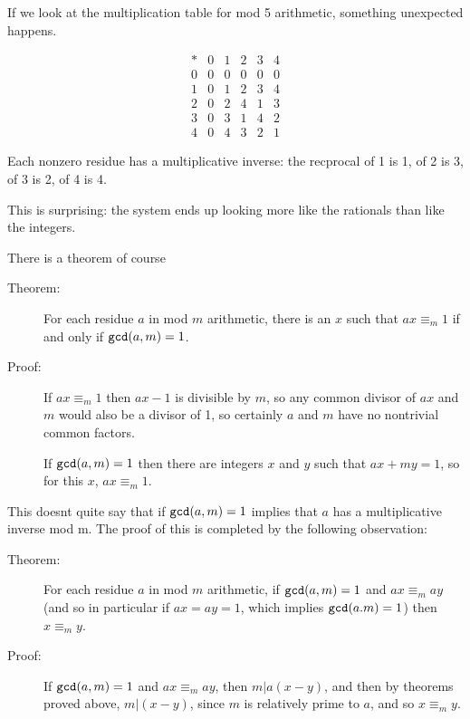 \documentclass[12pt]{article}
\begin{document}
\begin{description}
If we look at the multiplication table for mod 5 arithmetic, something unexpected happens.

$$\begin{array}{c|ccccc}

* & 0& 1 &2& 3 & 4\\ \hline

0 & 0& 0 &0& 0 &0 \\
1 & 0& 1 &2& 3 & 4\\
2& 0& 2 &4 & 1 & 3 \\
3& 0& 3 &1 & 4 & 2\\

4 & 0 & 4 & 3 & 2 & 1

\end{array}$$



\end{description}

Each nonzero residue has a multiplicative inverse:  the recprocal of 1 is 1, of 2 is 3, of 3 is 2, of 4 is 4.

This is surprising:  the system ends up looking more like the rationals than like the integers.

There is a theorem of course

\begin{description}

\item[Theorem:]  For each residue $a$ in mod $m$ arithmetic, there is an $x$ such that $ax \equiv_m 1$ if and only if
${\tt gcd}(a,m)=1$.

\item[Proof:]  If $ax \equiv_m 1$ then $ax-1$ is divisible by $m$, so any common divisor of $ax$ and $m$ would also be a divisor of 1,
so certainly $a$ and $m$ have no nontrivial common factors.

If ${\tt gcd}(a,m)=1$ then there are integers $x$ and $y$ such that $ax+my=1$, so for this $x$, $ax \equiv_m 1$.

\end{description}

This doesnt quite say that if ${\tt gcd}(a,m)=1$ implies that $a$ has a multiplicative inverse mod m.  The proof of this is completed
by the following observation:

\begin{description}

\item[Theorem:]  For each residue $a$ in mod $m$ arithmetic, if ${\tt gcd}(a,m)=1$ and $ax \equiv_m ay$ (and so in particular if $ax=ay=1$, which implies ${\tt gcd}(a.m)=1$) then $x \equiv_m y$.

\item[Proof:]  If ${\tt gcd}(a,m)=1$ and $ax \equiv_m ay$, then $m|a(x-y)$, and then by theorems proved above, $m|(x-y)$, since $m$ is relatively prime to $a$, and so $x \equiv_m y$.

\end{description}
\end{document}
